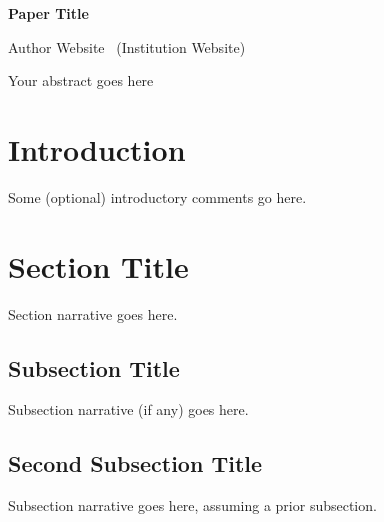 \documentclass[table, svgnames, dvipsnames, letterpaper, 11pt]{report}
\makeatletter
\theoremstyle{remark}
\def\\{}%
\renewenvironment{abstract}{%
      \@beginparpenalty\@lowpenalty
      \small
      \begin{center}%
        \bfseries \abstractname
        \@endparpenalty\@M
		\vspace*{-0.2in}
      \end{center}\quotation}%
     {\endquotation\par%
     }
\makeatother
\begin{document}

\begin{center}
{\bf \LARGE Paper Title}\\

\medskip

Author Website \, (Institution Website)

\label{authorlastname}

\end{center}

\vspace*{-0.2in}

\begin{abstract}
\noindent
Your abstract goes here
\end{abstract}

\section{Introduction}
Some (optional) introductory comments go here.

\section{Section Title} 
Section narrative goes here.

\subsection{Subsection Title} 
Subsection narrative (if any) goes here.

\subsection{Second Subsection Title} 
Subsection narrative goes here, assuming a prior subsection.
\end{document}
